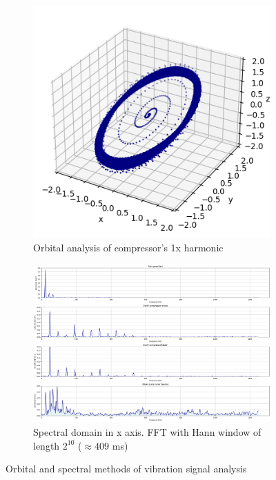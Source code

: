 \begin{figure}[ht]
    \centering
    \begin{subfigure}[b]{0.45\textwidth}
        \includegraphics[width=\textwidth]{assets/design/compressor-orbitals-1x.png}
	\caption{Orbital analysis of compressor's 1x harmonic}
    \end{subfigure}
    \hfill
    \begin{subfigure}[b]{0.54\textwidth}
        \includegraphics[width=\textwidth]{assets/design/EDA-custom-dataset-spectral-X-axis.png}
        \caption{Spectral domain in x axis. FFT with Hann window of length $2^{10}$ ($\approx 409$ ms)}
    \end{subfigure} 
    \caption{Orbital and spectral methods of vibration signal analysis}
\end{figure}

